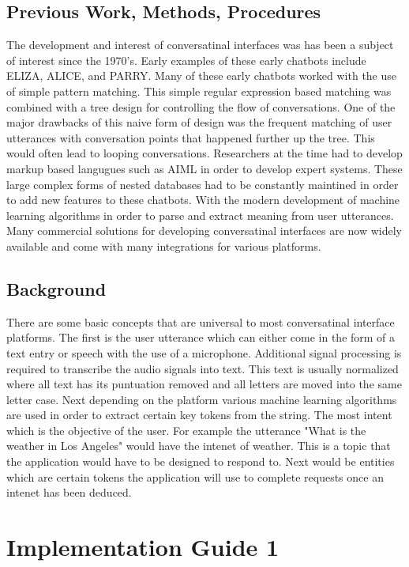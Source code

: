 \documentclass[9pt,software]{livecoms}
\begin{document}
\subsection{Previous Work, Methods, Procedures}
The development and interest of conversatinal interfaces was has been a subject of interest since the 1970's. Early examples of these
early chatbots include ELIZA, ALICE, and PARRY. Many of these early chatbots worked with the use of simple pattern matching. This simple 
regular expression based matching was combined with a tree design for controlling the flow of conversations. One of the major drawbacks of 
this naive form of design was the frequent matching of user utterances with conversation points that happened further up the tree. This 
would often lead to looping conversations. Researchers at the time had to develop markup based langugues such as AIML in order to develop 
expert systems. These large complex forms of nested databases had to be constantly maintined in order to add new features to these chatbots. 
With the modern development of machine learning algorithms in order to parse and extract meaning from user utterances. Many commercial solutions
for developing conversatinal interfaces are now widely available and come with many integrations for various platforms.
\subsection{Background}
There are some basic concepts that are universal to most conversatinal interface platforms. The first is the user utterance which can either come in 
the form of a text entry or speech with the use of a microphone. Additional signal processing is required to transcribe the audio signals into text. 
This text is usually normalized where all text has its puntuation removed and all letters are moved into the same letter case. Next depending on the 
platform various machine learning algorithms are used in order to extract certain key tokens from the string. The most intent which is the objective
of the user. For example the utterance "What is the weather in Los Angeles" would have the intenet of weather. This is a topic that the application
would have to be designed to respond to. Next would be entities which are certain tokens the application will use to complete requests once an intenet
has been deduced.

\section{Implementation Guide 1}
\end{document}
